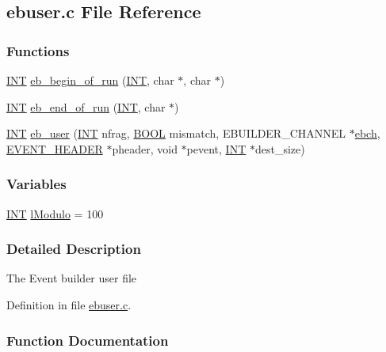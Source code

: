 \subsection{ebuser.c File Reference}
\label{ebuser_8c}
\subsubsection*{Functions}
\begin{DoxyCompactItemize}
\item 
\hyperlink{vppg_8h_a392e62da233ed3e2f7c3fd4f487a3896}{INT} \hyperlink{ebuser_8c_aac338f16c26978fda836e729d5c6e366}{eb\_\-begin\_\-of\_\-run} (\hyperlink{vppg_8h_a392e62da233ed3e2f7c3fd4f487a3896}{INT}, char $\ast$, char $\ast$)
\item 
\hyperlink{vppg_8h_a392e62da233ed3e2f7c3fd4f487a3896}{INT} \hyperlink{ebuser_8c_a98d66006b73521032c8d02040f6cf4b8}{eb\_\-end\_\-of\_\-run} (\hyperlink{vppg_8h_a392e62da233ed3e2f7c3fd4f487a3896}{INT}, char $\ast$)
\item 
\hyperlink{vppg_8h_a392e62da233ed3e2f7c3fd4f487a3896}{INT} \hyperlink{ebuser_8c_a1ed2952fe1f5feb08e6dddc94a26288b}{eb\_\-user} (\hyperlink{vppg_8h_a392e62da233ed3e2f7c3fd4f487a3896}{INT} nfrag, \hyperlink{vt2_8h_a239c7f0d40651c3e419c5b9651507d14}{BOOL} mismatch, EBUILDER\_\-CHANNEL $\ast$\hyperlink{mevb_8c_a20754034bec49b7ee4e69ef89078443f}{ebch}, \hyperlink{structEVENT__HEADER}{EVENT\_\-HEADER} $\ast$pheader, void $\ast$pevent, \hyperlink{vppg_8h_a392e62da233ed3e2f7c3fd4f487a3896}{INT} $\ast$dest\_\-size)
\end{DoxyCompactItemize}
\subsubsection*{Variables}
\begin{DoxyCompactItemize}
\item 
\hyperlink{vppg_8h_a392e62da233ed3e2f7c3fd4f487a3896}{INT} \hyperlink{ebuser_8c_a931a4ca265e2b03c9b59e773b628c1d2}{lModulo} = 100
\end{DoxyCompactItemize}


\subsubsection{Detailed Description}
The Event builder user file 

Definition in file \hyperlink{ebuser_8c_source}{ebuser.c}.

\subsubsection{Function Documentation}
